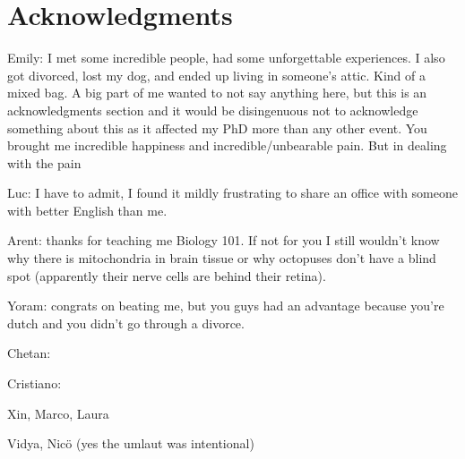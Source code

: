 \chapter*{Acknowledgments}


Emily: 
I met some incredible people, had some unforgettable experiences. I also got divorced, lost my dog, and ended up living in someone's attic. Kind of a mixed bag.
A big part of me wanted to not say anything here, but this is an acknowledgments section and it would be disingenuous not to acknowledge something about this as it affected my PhD more than any other event. You brought me incredible happiness and incredible/unbearable pain. But in dealing with the pain

Luc: I have to admit, I found it mildly frustrating to share an office with someone with better English than me.

Arent: thanks for teaching me Biology 101. If not for you I still wouldn't know why there is mitochondria in brain tissue or why octopuses don't have a blind spot (apparently their nerve cells are behind their retina). 

Yoram: congrats on beating me, but you guys had an advantage because you're dutch and you didn't go through a divorce.

Chetan: 

Cristiano:

Xin, Marco, Laura

Vidya, Nicö (yes the umlaut was intentional)

